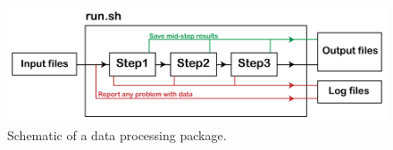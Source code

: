 \begin{figure} [ht]
\centering
\includegraphics[scale=0.8]{figures/pdf/Figure01.pdf} 
\caption{Schematic of a data processing package.}
\label{fig:structure}
\end{figure}



